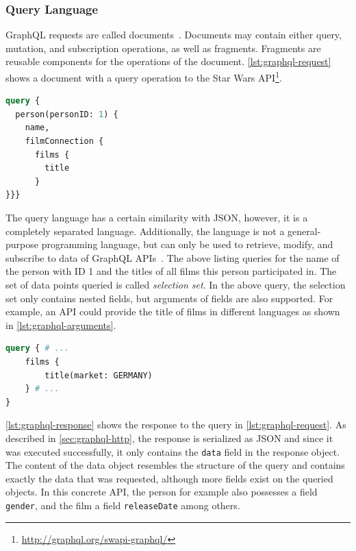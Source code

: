 \subsubsection{Query Language}\label{sec:graphql-query-lang}

GraphQL requests are called documents~\cite{Facebook2018}.
Documents may contain either query, mutation, and subscription operations, as well as fragments.
Fragments are reusable components for the operations of the document.
\autoref{lst:graphql-request} shows a document with a query operation to the Star Wars \ac{API}\footnote{\url{http://graphql.org/swapi-graphql/}}.

\begin{lstlisting}[language=graphql, caption={GraphQL Request}, label={lst:graphql-request}]
query {
  person(personID: 1) {
    name,
    filmConnection {
      films {
        title
      }
}}}
\end{lstlisting}

The query language has a certain similarity with \ac{JSON}, however, it is a completely separated language.
Additionally, the language is not a general-purpose programming language, but can only be used to retrieve, modify, and subscribe to data of GraphQL \acp{API}~\cite{Facebook2018}.
The above listing queries for the name of the person with ID 1 and the titles of all films this person participated in.
The set of data points queried is called \textit{selection set}.
In the above query, the selection set only contains nested fields, but arguments of fields are also supported.
For example, an \ac{API} could provide the title of films in different languages as shown in  \autoref{lst:graphql-arguments}.

\begin{lstlisting}[language=graphql, caption={GraphQL Request with Field Arguments}, label={lst:graphql-arguments}]
query { # ...
    films {
        title(market: GERMANY)
    } # ...
}
\end{lstlisting}

\autoref{lst:graphql-response} shows the response to the query in \autoref{lst:graphql-request}.
As described in \autoref{sec:graphql-http}, the response is serialized as \ac{JSON} and since it was executed successfully, it only contains the \texttt{data} field in the response object.
The content of the data object resembles the structure of the query and contains exactly the data that was requested, although more fields exist on the queried objects.
In this concrete \ac{API}, the person for example also possesses a field \texttt{gender}, and the film a field \texttt{releaseDate} among others.

